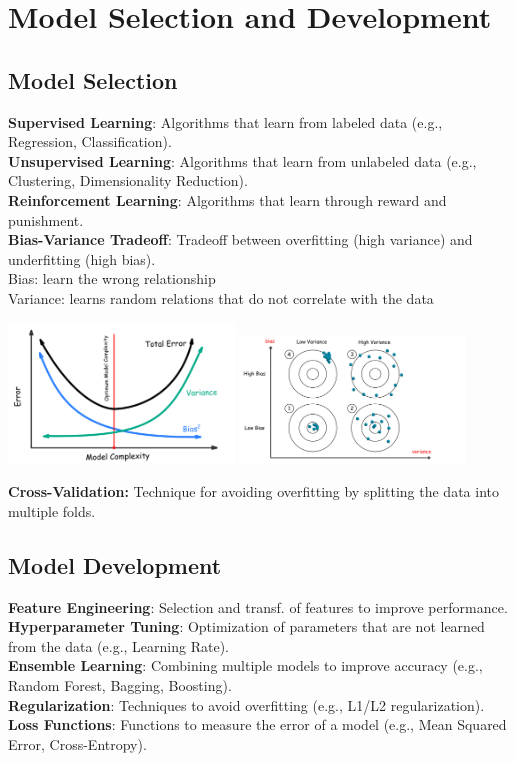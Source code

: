 \documentclass[english, threecolumn]{latex4ei/latex4ei_sheet}
\begin{document}
\section{Model Selection and Development}
\begin{sectionbox}
    
\subsection{Model Selection}
\textbf{Supervised Learning}: Algorithms that learn from labeled data (e.g., Regression, Classification).\\
\textbf{Unsupervised Learning}: Algorithms that learn from unlabeled data (e.g., Clustering, Dimensionality Reduction).\\
\textbf{Reinforcement Learning}: Algorithms that learn through reward and punishment.\\
\textbf{Bias-Variance Tradeoff}: Tradeoff between overfitting (high variance) and underfitting (high bias).\\
Bias: learn the wrong relationship\\
Variance: learns random relations that do not correlate with the data

\includegraphics[width=0.45\textwidth]{img/biasvariance.png}
\includegraphics[width=0.45\textwidth]{img/biasmatrix.png}

\textbf{Cross-Validation:} Technique for avoiding overfitting by splitting the data into multiple folds.

\subsection{Model Development}
\textbf{Feature Engineering}: Selection and transf. of features to improve performance.\\
\textbf{Hyperparameter Tuning}: Optimization of parameters that are not learned from the data (e.g., Learning Rate).\\
\textbf{Ensemble Learning}: Combining multiple models to improve accuracy (e.g., Random Forest, Bagging, Boosting).\\
\textbf{Regularization}: Techniques to avoid overfitting (e.g., L1/L2 regularization).\\
\textbf{Loss Functions}: Functions to measure the error of a model (e.g., Mean Squared Error, Cross-Entropy).
\end{sectionbox}
\end{document}

